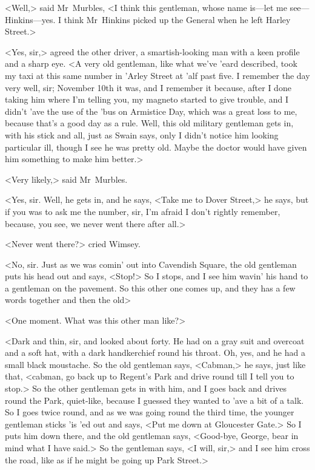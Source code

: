 <Well,> said Mr~Murbles, <I think this gentleman, whose name is—let me see—Hinkins—yes. I think Mr~Hinkins picked up the General when he left Harley Street.>

<Yes, sir,> agreed the other driver, a smartish-looking man with a keen profile and a sharp eye. <A very old gentleman, like what we've 'eard described, took my taxi at this same number in 'Arley Street at 'alf past five. I remember the day very well, sir; November  10th it was, and I remember it because, after I done taking him where I'm telling you, my magneto started to give trouble, and I didn't 'ave the use of the 'bus on Armistice Day, which was a great loss to me, because that's a good day as a rule. Well, this old military gentleman gets in, with his stick and all, just as Swain says, only I didn't notice him looking particular ill, though I see he was pretty old. Maybe the doctor would have given him something to make him better.>

<Very likely,> said Mr~Murbles.

<Yes, sir. Well, he gets in, and he says, <Take me to Dover Street,> he says, but if you was to ask me the number, sir, I'm afraid I don't rightly remember, because, you see, we never went there after all.>

<Never went there?> cried Wimsey.

<No, sir. Just as we was comin' out into Cavendish Square, the old gentleman puts his head out and says, <Stop!> So I stops, and I see him wavin' his hand to a gentleman on the pavement. So this other one comes up, and they has a few words together and then the old\longdash>

<One moment. What was this other man like?>

<Dark and thin, sir, and looked about forty. He had on a gray suit and overcoat and a soft hat, with a dark handkerchief round his throat. Oh, yes, and he had a small black moustache. So the old gentleman says, <Cabman,> he says, just like that, <cabman, go back up to Regent's Park and drive round till I tell you to stop.> So the other gentleman gets in with him, and I goes back and drives round the Park, quiet-like, because I guessed they wanted to 'ave a bit of a talk. So I goes twice round, and as we was going round the third time, the younger gentleman sticks 'is 'ed out and says, <Put me down at Gloucester Gate.> So I puts him down there, and the old gentleman says, <Good-bye, George, bear in mind what I have said.> So the gentleman says, <I will, sir,> and I see him cross the road, like as if he might be going up Park Street.>

